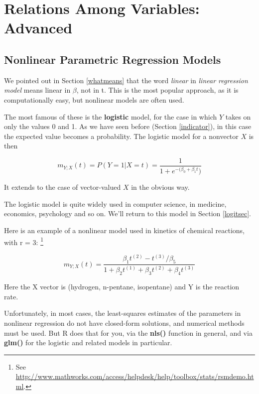 \chapter{Relations Among Variables: Advanced}
\label{chap:advrels}

\section{Nonlinear Parametric Regression Models}
\label{nonlin}

We pointed out in Section \ref{whatmeans} that the word {\it linear} in
{\it linear regression model} means linear in $\beta$, not in t.  This
is the most popular approach, as it is computationally easy, but
nonlinear models are often used.

The most famous of these is the {\bf logistic} model, for the case in
which $Y$ takes on only the values 0 and 1.  As we have seen before
(Section \ref{indicator}), in this case the expected value becomes a
probability.  The logistic model for a nonvector $X$ is then

\begin{equation}
\label{logit}
m_{Y;X}(t) = P(Y = 1 | X = t) = \frac{1}{1+e^{-(\beta_0+\beta_1 t})}
\end{equation}

It extends to the case of vector-valued $X$ in the obvious way. 

The logistic model is quite widely used in computer science, in medicine,
economics, psychology and so on.  We'll return to this model in Section
\ref{logitsec}.

Here is an example of a nonlinear model used in kinetics of chemical
reactions, with r = 3: \footnote{See
\url{http://www.mathworks.com/access/helpdesk/help/toolbox/stats/rsmdemo.html}.}

\begin{equation}
m_{Y;X}(t) = \frac
{\beta_1 t^{(2)} - t^{(3)}/\beta_5}
{1+\beta_2 t^{(1)} + \beta_3 t^{(2)} + \beta_4 t^{(3)}}
\end{equation}

Here the X vector is (hydrogen, n-pentane, isopentane) and Y is the
reaction rate.

Unfortunately, in most cases, the least-squares estimates of the
parameters in nonlinear regression do not have closed-form solutions,
and numerical methods must be used.  But R does that for you, via the
{\bf nls()} function in general, and via {\bf glm()} for the logistic
and related models in particular.

